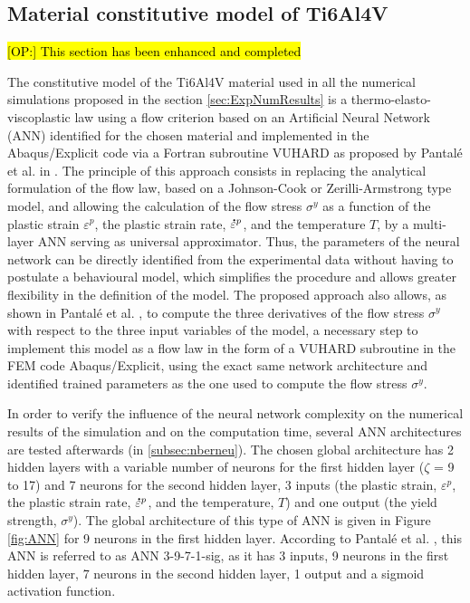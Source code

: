 \documentclass[preprint,12pt,times]{elsarticle}
\newcommand{\mdot}[1]{\accentset{\mbox{\bfseries .}}{#1}} %
\DeclareRobustCommand{\OP}[1]{ {\begingroup\sethlcolor{VWblue}\textcolor{black}{\hl{[OP:] #1}}\endgroup} }
\begin{document}
\subsection{Material constitutive model of Ti6Al4V}
\OP{This section has been enhanced and completed}

The constitutive model of the Ti6Al4V material used in all the numerical simulations proposed in the section \ref{sec:ExpNumResults} is a thermo-elasto-viscoplastic law using a flow criterion based on an Artificial Neural Network (ANN) identified for the chosen material and implemented in the Abaqus/Explicit code via a Fortran subroutine VUHARD as proposed by Pantalé et al. in \cite{pantale_Efficient_2022}.
The principle of this approach consists in replacing the analytical formulation of the flow law, based on a Johnson-Cook or Zerilli-Armstrong type model, and allowing the calculation of the flow stress $\sigma^y$ as a function of the plastic strain $\varepsilon^p$, the plastic strain rate, $\mdot{\varepsilon}^p$, and the temperature $T$, by a multi-layer ANN serving as universal approximator. Thus, the parameters of the neural network can be directly identified from the experimental data without having to postulate a behavioural model, which simplifies the procedure and allows greater flexibility in the definition of the model.
The proposed approach also allows, as shown in Pantalé et al. \cite{pantale_Efficient_2022}, to compute the three derivatives of the flow stress $\sigma^y$ with respect to the three input variables of the model, a necessary step to implement this model as a flow law in the form of a VUHARD subroutine in the FEM code Abaqus/Explicit, using the exact same network architecture and identified trained parameters as the one used to compute the flow stress $\sigma^y$.

In order to verify the influence of the neural network complexity on the numerical results of the simulation and on the computation time, several ANN architectures are tested afterwards (in \ref{subsec:nberneu}). The chosen global architecture has 2 hidden layers with a variable number of neurons for the first hidden layer ($\zeta$ = 9 to 17) and 7 neurons for the second hidden layer, 3 inputs (the plastic strain, $\varepsilon^p$, the plastic strain rate, $\mdot{\varepsilon}^p$, and the temperature, $T$) and one output (the yield strength, $\sigma^y$). The global architecture of this type of ANN is given in Figure \ref{fig:ANN} for 9 neurons in the first hidden layer. According to Pantalé et al. \cite{pantale_Efficient_2022}, this ANN is referred to as ANN 3-9-7-1-sig, as it has 3 inputs, 9 neurons in the first hidden layer, 7 neurons in the second hidden layer, 1 output and a sigmoid activation function.
\end{document}
